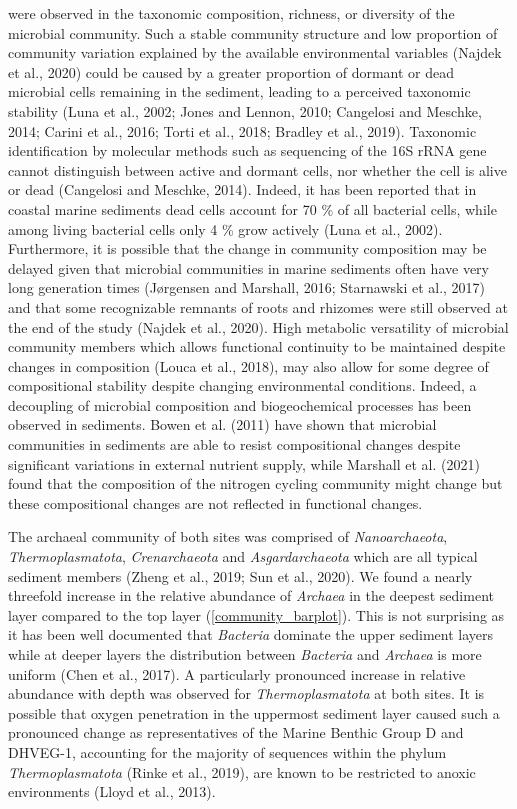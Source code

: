 \documentclass[12pt,]{article}
\begin{document}
were observed in the taxonomic composition, richness, or diversity of
the microbial community. Such a stable community structure and low
proportion of community variation explained by the available
environmental variables (Najdek et al., 2020) could be caused by a
greater proportion of dormant or dead microbial cells remaining in the
sediment, leading to a perceived taxonomic stability (Luna et al., 2002;
Jones and Lennon, 2010; Cangelosi and Meschke, 2014; Carini et al.,
2016; Torti et al., 2018; Bradley et al., 2019). Taxonomic
identification by molecular methods such as sequencing of the 16S rRNA
gene cannot distinguish between active and dormant cells, nor whether
the cell is alive or dead (Cangelosi and Meschke, 2014). Indeed, it has
been reported that in coastal marine sediments dead cells account for 70
\si{\percent} of all bacterial cells, while among living bacterial cells
only 4 \si{\percent} grow actively (Luna et al., 2002). Furthermore, it
is possible that the change in community composition may be delayed
given that microbial communities in marine sediments often have very
long generation times (Jørgensen and Marshall, 2016; Starnawski et al.,
2017) and that some recognizable remnants of roots and rhizomes were
still observed at the end of the study (Najdek et al., 2020). High
metabolic versatility of microbial community members which allows
functional continuity to be maintained despite changes in composition
(Louca et al., 2018), may also allow for some degree of compositional
stability despite changing environmental conditions. Indeed, a
decoupling of microbial composition and biogeochemical processes has
been observed in sediments. Bowen et al. (2011) have shown that
microbial communities in sediments are able to resist compositional
changes despite significant variations in external nutrient supply,
while Marshall et al. (2021) found that the composition of the nitrogen
cycling community might change but these compositional changes are not
reflected in functional changes.

The archaeal community of both sites was comprised of
\emph{Nanoarchaeota}, \emph{Thermoplasmatota}, \emph{Crenarchaeota} and
\emph{Asgardarchaeota} which are all typical sediment members (Zheng et
al., 2019; Sun et al., 2020). We found a nearly threefold increase in
the relative abundance of \emph{Archaea} in the deepest sediment layer
compared to the top layer (\autoref{community_barplot}). This is not
surprising as it has been well documented that \emph{Bacteria} dominate
the upper sediment layers while at deeper layers the distribution
between \emph{Bacteria} and \emph{Archaea} is more uniform (Chen et al.,
2017). A particularly pronounced increase in relative abundance with
depth was observed for \emph{Thermoplasmatota} at both sites. It is
possible that oxygen penetration in the uppermost sediment layer caused
such a pronounced change as representatives of the Marine Benthic Group
D and DHVEG-1, accounting for the majority of sequences within the
phylum \emph{Thermoplasmatota} (Rinke et al., 2019), are known to be
restricted to anoxic environments (Lloyd et al., 2013).
\end{document}
